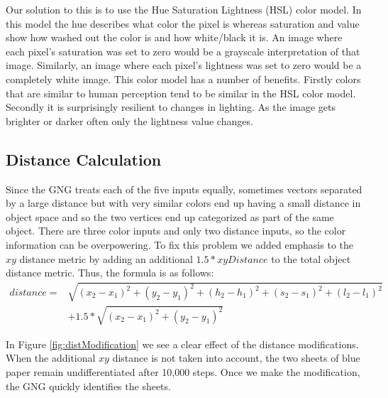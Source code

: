 \documentclass{article}
\renewcommand{\|}{\origbar} %
\begin{document}
Our solution to this is to use the Hue Saturation Lightness (HSL) color model. In this model the hue describes what color the pixel is whereas saturation and value show how washed out the color is and how white/black it is. An image where each pixel's saturation was set to zero would be a grayscale interpretation of that image. Similarly, an image where each pixel's lightness was set to zero would be a completely white image. This color model has a number of benefits. Firstly colors that are similar to human perception tend to be similar in the HSL color model. Secondly it is surprisingly resilient to changes in lighting. As the image gets brighter or darker often only the lightness value changes.


\subsection{Distance Calculation}


Since the GNG treats each of the five inputs equally, sometimes vectors separated by a large distance but with very similar colors end up having a small distance in object space and so the two vertices end up categorized as part of the same object. There are three color inputs and only two distance inputs, so the color information can be overpowering. To fix this problem we added emphasis to the $xy$ distance metric by adding an additional $1.5 * xyDistance$ to the total object distance metric. Thus, the formula is as follows:
\begin{align*}
  distance = &\sqrt{(x_2-x_1)^2+(y_2-y_1)^2+(h_2-h_1)^2+(s_2-s_1)^2+(l_2-l_1)^2} \\ &+ 1.5*\sqrt{(x_2-x_1)^2+(y_2-y_1)^2}
\end{align*}

In Figure \ref{fig:distModification} we see a clear effect of the distance modifications. When the additional $xy$ distance is not taken into account, the two sheets of blue paper remain undifferentiated after 10,000 steps. Once we make the modification, the GNG quickly identifies the sheets.
\end{document}
